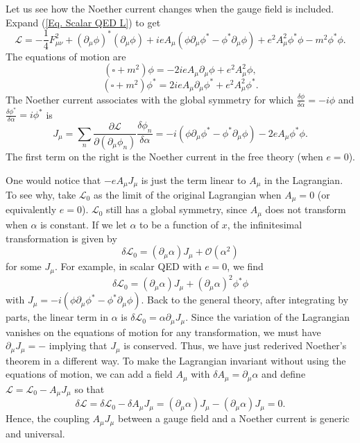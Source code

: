 \documentclass[11pt]{article}
\theoremstyle{definition}
\begin{document}
Let us see how the Noether current changes when the gauge field is included. Expand (\ref{Eq. Scalar QED L}) to get
\begin{equation}
    \mathcal{L} = -\frac{1}{4}F^2_{\mu\nu} + (\partial_\mu\phi)^*(\partial_\mu\phi) + ieA_\mu(\phi\partial_\mu\phi^* - \phi^*\partial_\mu\phi) + e^2A_\mu^2\phi^*\phi - m^2 \phi^*\phi.
\end{equation}
The equations of motion are
\begin{equation}
    (\square + m^2)\phi = -2ieA_\mu\partial_\mu\phi + e^2A_\mu^2\phi,
\end{equation}
\begin{equation}
    (\square + m^2)\phi^* = 2ieA_\mu\partial_\mu\phi^* + e^2A_\mu^2\phi^*.
\end{equation}
The Noether current associates with the global symmetry for which $\frac{\delta\phi}{\delta\alpha} = -i\phi$ and $\frac{\delta\phi^*}{\delta\alpha} = i\phi^*$ is
\begin{equation}
    J_\mu = \sum_n \frac{\partial\mathcal{L}}{\partial(\partial_\mu\phi_n)}\frac{\delta\phi_n}{\delta\alpha} = -i(\phi\partial_\mu\phi^* - \phi^*\partial_\mu\phi) - 2eA_\mu\phi^*\phi.
\end{equation}
The first term on the right is the Noether current in the free theory (when $e=0$).

One would notice that $-eA_\mu J_\mu$ is just the term linear to $A_\mu$ in the Lagrangian. To see why, take $\mathcal{L}_0$ as the limit of the original Lagrangian when $A_\mu=0$ (or equivalently $e=0$). $\mathcal{L}_0$ still has a global symmetry, since $A_\mu$ does not transform when $\alpha$ is constant. If we let $\alpha$ to be a function of $x$, the infinitesimal transformation is given by
\begin{equation}
    \delta\mathcal{L}_0 = (\partial_\mu\alpha)J_\mu + \mathcal{O}(\alpha^2)
\end{equation}
for some $J_\mu$. For example, in scalar QED with $e=0$, we find
\begin{equation}
    \delta\mathcal{L}_0 = (\partial_\mu\alpha)J_\mu + (\partial_\mu\alpha)^2\phi^*\phi
\end{equation}
with $J_\mu = -i(\phi\partial_\mu\phi^* - \phi^*\partial_\mu\phi)$. Back to the general theory, after integrating by parts, the linear term in $\alpha$ is $\delta\mathcal{L}_0=\alpha\partial_\mu J_\mu$. Since the variation of the Lagrangian vanishes on the equations of motion for any transformation, we must have $\partial_\mu J_\mu = -$ implying that $J_\mu$ is conserved. Thus, we have just rederived Noether's theorem in a different way. To make the Lagrangian invariant without using the equations of motion, we can add a field $A_\mu$ with $\delta A_\mu = \partial_\mu\alpha$ and define $\mathcal{L} = \mathcal{L}_0- A_\mu J_\mu$ so that 
\begin{equation}
    \delta \mathcal{L} = \delta \mathcal{L}_0- \delta A_\mu J_\mu = (\partial_\mu\alpha)J_\mu - (\partial_\mu\alpha)J_\mu = 0.
\end{equation}
Hence, the coupling $A_\mu J_\mu$ between a gauge field and a Noether current is generic and universal.
\end{document}
